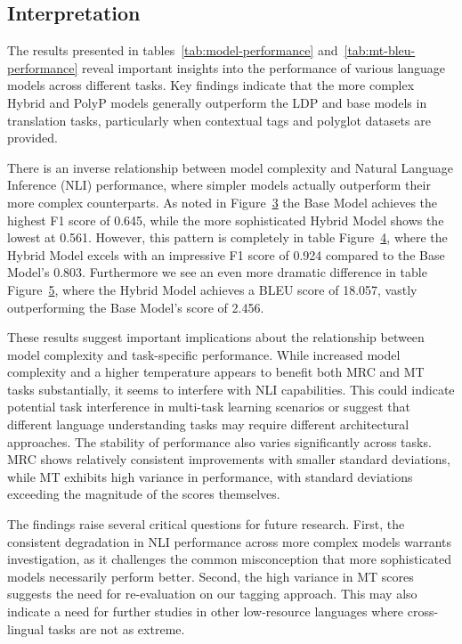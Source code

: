 \subsection{Interpretation}

The results presented in tables~\ref{tab:model-performance} and~\ref{tab:mt-bleu-performance} reveal important insights into the performance of various language models across different tasks. Key findings indicate that the more complex Hybrid and PolyP models generally outperform the LDP and base models in translation tasks, particularly when contextual tags and polyglot datasets are provided. 

There is an inverse relationship between model complexity and Natural Language Inference (NLI) performance, where simpler models actually outperform their more complex counterparts. As noted in Figure~\hyperref[fig:nli-scores]{3} the Base Model achieves the highest F1 score of 0.645, while the more sophisticated Hybrid Model shows the lowest at 0.561. However, this pattern is completely in table Figure~\hyperref[fig:mrc-scores]{4}, where the Hybrid Model excels with an impressive F1 score of 0.924 compared to the Base Model's 0.803. Furthermore we see an even more dramatic difference in table Figure~\hyperref[fig:mt-scores]{5}, where the Hybrid Model achieves a BLEU score of 18.057, vastly outperforming the Base Model's score of 2.456.

These results suggest important implications about the relationship between model complexity and task-specific performance. While increased model complexity and a higher temperature appears to benefit both MRC and MT tasks substantially, it seems to interfere with NLI capabilities. This could indicate potential task interference in multi-task learning scenarios or suggest that different language understanding tasks may require different architectural approaches. The stability of performance also varies significantly across tasks. MRC shows relatively consistent improvements with smaller standard deviations, while MT exhibits high variance in performance, with standard deviations exceeding the magnitude of the scores themselves.

The findings raise several critical questions for future research. First, the consistent degradation in NLI performance across more complex models warrants investigation, as it challenges the common misconception that more sophisticated models necessarily perform better. Second, the high variance in MT scores suggests the need for re-evaluation on our tagging approach. This may also indicate a need for further studies in other low-resource languages where cross-lingual tasks are not as extreme.





